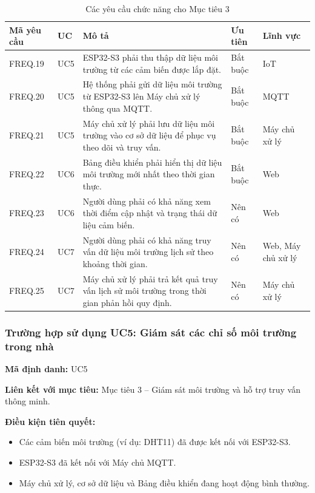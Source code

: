 \documentclass[a4paper,12pt]{article}
\begin{document}
\begin{table}[H]
\centering
\caption{Các yêu cầu chức năng cho Mục tiêu 3}
\small
\begin{tabularx}{\linewidth}{|p{1.8cm}|p{1.2cm}|X|p{2cm}|p{2.2cm}|}
\hline
\textbf{Mã yêu cầu} & \textbf{UC} & \textbf{Mô tả} & \textbf{Ưu tiên} & \textbf{Lĩnh vực} \\
\hline
FREQ.19 & UC5 & ESP32-S3 phải thu thập dữ liệu môi trường từ các cảm biến được lắp đặt. & Bắt buộc & IoT \\
\hline
FREQ.20 & UC5 & Hệ thống phải gửi dữ liệu môi trường từ ESP32-S3 lên Máy chủ xử lý thông qua MQTT. & Bắt buộc & MQTT \\
\hline
FREQ.21 & UC5 & Máy chủ xử lý phải lưu dữ liệu môi trường vào cơ sở dữ liệu để phục vụ theo dõi và truy vấn. & Bắt buộc & Máy chủ xử lý \\
\hline
FREQ.22 & UC6 & Bảng điều khiển phải hiển thị dữ liệu môi trường mới nhất theo thời gian thực. & Bắt buộc & Web \\
\hline
FREQ.23 & UC6 & Người dùng phải có khả năng xem thời điểm cập nhật và trạng thái dữ liệu cảm biến. & Nên có & Web \\
\hline
FREQ.24 & UC7 & Người dùng phải có khả năng truy vấn dữ liệu môi trường lịch sử theo khoảng thời gian. & Nên có & Web, Máy chủ xử lý \\
\hline
FREQ.25 & UC7 & Máy chủ xử lý phải trả kết quả truy vấn lịch sử môi trường trong thời gian phản hồi quy định. & Nên có & Máy chủ xử lý \\
\hline
\end{tabularx}
\end{table}

\subsubsection{Trường hợp sử dụng UC5: Giám sát các chỉ số môi trường trong nhà}

\textbf{Mã định danh:} UC5

\textbf{Liên kết với mục tiêu:} Mục tiêu 3 -- Giám sát môi trường và hỗ trợ truy vấn thông minh.

\textbf{Điều kiện tiên quyết:}
\begin{itemize}
    \item Các cảm biến môi trường (ví dụ: DHT11) đã được kết nối với ESP32-S3.
    \item ESP32-S3 đã kết nối với Máy chủ MQTT.
    \item Máy chủ xử lý, cơ sở dữ liệu và Bảng điều khiển đang hoạt động bình thường.
\end{itemize}
\end{document}

